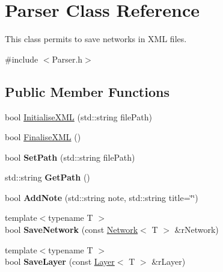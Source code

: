 \hypertarget{class_parser}{\section{Parser Class Reference}
\label{class_parser}
}


This class permits to save networks in X\-M\-L files.  




{\ttfamily \#include $<$Parser.\-h$>$}

\subsection*{Public Member Functions}
\begin{DoxyCompactItemize}
\item 
bool \hyperlink{class_parser_a318a8a1b41e2c61dc32ddc9dca8b3e0b}{Initialise\-X\-M\-L} (std\-::string file\-Path)
\item 
bool \hyperlink{class_parser_a1717f9c75640cbfea99d1fbce0c19a2b}{Finalise\-X\-M\-L} ()
\item 
\hypertarget{class_parser_a15b8895c750b64246db278d974c015d9}{bool {\bfseries Set\-Path} (std\-::string file\-Path)}\label{class_parser_a15b8895c750b64246db278d974c015d9}

\item 
\hypertarget{class_parser_a2bfbe504553d36e4fd0a4e1224b3ffc8}{std\-::string {\bfseries Get\-Path} ()}\label{class_parser_a2bfbe504553d36e4fd0a4e1224b3ffc8}

\item 
\hypertarget{class_parser_a33cf5494cdd71d936e370adb88d59f52}{bool {\bfseries Add\-Note} (std\-::string note, std\-::string title=\char`\"{}\char`\"{})}\label{class_parser_a33cf5494cdd71d936e370adb88d59f52}

\item 
\hypertarget{class_parser_ac24b45199cae7358fbfb30943c527d09}{{\footnotesize template$<$typename T $>$ }\\bool {\bfseries Save\-Network} (const \hyperlink{class_network}{Network}$<$ T $>$ \&r\-Network)}\label{class_parser_ac24b45199cae7358fbfb30943c527d09}

\item 
\hypertarget{class_parser_ac47cb9ddac8b7b0f9dfd21842e31f8c5}{{\footnotesize template$<$typename T $>$ }\\bool {\bfseries Save\-Layer} (const \hyperlink{class_layer}{Layer}$<$ T $>$ \&r\-Layer)}\label{class_parser_ac47cb9ddac8b7b0f9dfd21842e31f8c5}


\end{DoxyCompactItemize}
